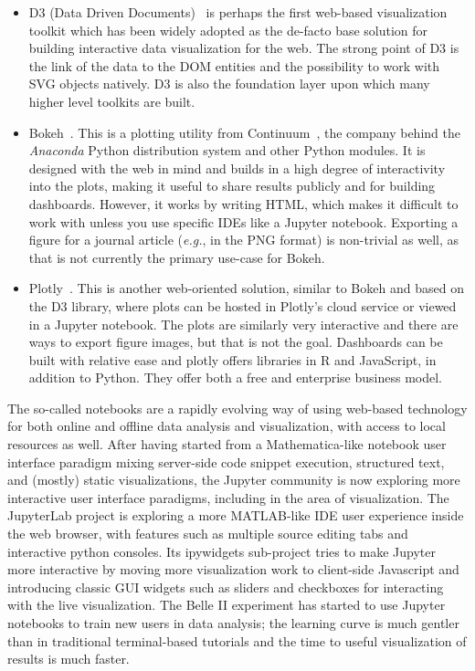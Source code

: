 \documentclass[12pt,a4paper]{article}
\begin{document}
\begin{itemize}
\item D3 (Data Driven Documents)~\cite{D32011} is perhaps the first web-based visualization toolkit which has been widely
adopted as the de-facto base solution for building interactive data visualization for the web. The strong point of D3 is the
link of the data to the DOM entities and the possibility to work with SVG objects natively. D3 is also the foundation layer
upon which many higher level toolkits are built.

\item Bokeh~\cite{Bokeh2014}. This is a plotting utility from Continuum~\cite{continuum}, the company behind the
\textit{Anaconda} Python distribution system and other Python modules. It is designed with the web in mind and builds in a high degree of
interactivity into the plots, making it useful to share results publicly and for building dashboards. However, it works by
writing HTML, which makes it difficult to work with unless you use specific IDEs like a Jupyter notebook. Exporting a figure
for a journal article ({\it e.g.}, in the PNG format) is non-trivial as well, as that is not currently the primary use-case for Bokeh.

\item Plotly~\cite{Plotly2015}. This is another web-oriented solution, similar to Bokeh and based on the D3 library, where plots
can be hosted in Plotly’s cloud service or viewed in a Jupyter notebook. The plots are similarly very interactive and there
are ways to export figure images, but that is not the goal. Dashboards can be built with relative ease and plotly offers
libraries in R and JavaScript, in addition to Python. They offer both a free and enterprise business model.
\end{itemize}

The so-called notebooks are a rapidly evolving way of using web-based technology for both online and offline data analysis and
visualization, with access to local resources as well. After having started from a Mathematica-like notebook user interface
paradigm mixing server-side code snippet execution, structured text, and (mostly) static visualizations, the Jupyter community
is now exploring more interactive user interface paradigms, including in the area of visualization. The JupyterLab project is
exploring a more MATLAB-like IDE user experience inside the web browser, with features such as multiple source editing tabs
and interactive python consoles. Its ipywidgets sub-project tries to make Jupyter more interactive by moving more visualization
work to client-side Javascript and introducing classic GUI widgets such as sliders and checkboxes for interacting with the live visualization.
The Belle II experiment has started to use Jupyter notebooks to train new users in data analysis; the learning curve is much gentler than in
traditional terminal-based tutorials and the time to useful visualization of results is much faster.
\end{document}

